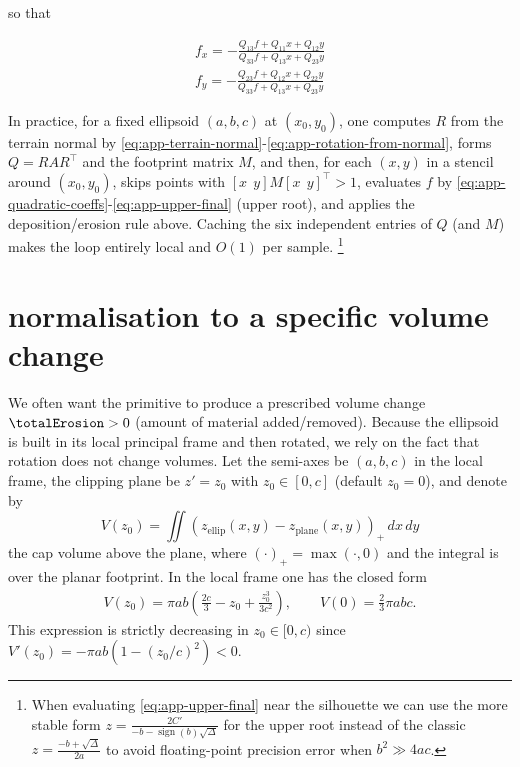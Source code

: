 so that

\begin{align}
    \label{eq:app-fx}
    f_x = -\frac{Q_{13}f + Q_{11}x + Q_{12}y}{Q_{33}f + Q_{13}x + Q_{23}y} \\
    \label{eq:app-fy}
    f_y = -\frac{Q_{23}f + Q_{12}x + Q_{22}y}{Q_{33}f + Q_{13}x + Q_{23}y}
\end{align}

In practice, for a fixed ellipsoid $(a,b,c)$ at $(x_0,y_0)$, one computes $R$ from the terrain normal by \cref{eq:app-terrain-normal}-\cref{eq:app-rotation-from-normal}, forms $Q=RAR^\top $ and the footprint matrix $M$, and then, for each $(x,y)$ in a stencil around $(x_0,y_0)$, skips points with $[x\ \ y] M [x\ \ y]^\top >1$, evaluates $f$ by \cref{eq:app-quadratic-coeffs}-\cref{eq:app-upper-final} (upper root), and applies the deposition/erosion rule above. Caching the six independent entries of $Q$ (and $M$) makes the loop entirely local and $O(1)$ per sample. 
\footnote{When evaluating \cref{eq:app-upper-final} near the silhouette we can use the more stable form
$z=\frac{2C'}{-b - \operatorname{sign}(b)\sqrt{\Delta}}$
for the upper root instead of the classic 
$z=\frac{-b + \sqrt{\Delta}}{2a}$ 
to avoid floating-point precision error when $b^2 \gg 4ac$.}



\section*{normalisation to a specific volume change}

We often want the primitive to produce a prescribed volume change $\totalErosion>0$ (amount of material added/removed). Because the ellipsoid is built in its local principal frame and then rotated, we rely on the fact that rotation does not change volumes. Let the semi-axes be $(a,b,c)$ in the local frame, the clipping plane be $z'=z_0$ with $z_0\in[0,c]$ (default $z_0=0$), and denote by
\[
V(z_0)=\iint \left(z_{\text{ellip}}(x,y)-z_{\text{plane}}(x,y)\right)_+\,dx\,dy
\]
the cap volume above the plane, where $(\cdot)_+=\max(\cdot,0)$ and the integral is over the planar footprint. In the local frame one has the closed form
\begin{align}
    \label{eq:app-cap-volume}
    V(z_0)=\pi a b\left(\frac{2c}{3}-z_0+\frac{z_0^3}{3c^2}\right),\qquad V(0)=\frac{2}{3}\pi a b c.
\end{align}
This expression is strictly decreasing in $z_0\in[0,c)$ since $V'(z_0)=-\pi a b\left(1-(z_0/c)^2\right)<0$.

